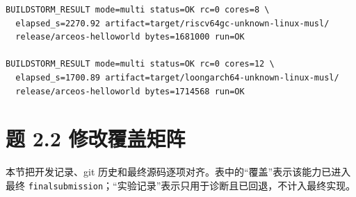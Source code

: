 \documentclass[UTF8,zihao=-4]{ctexart}
\newcommand{\code}{\nolinkurl}
\begin{document}
\begin{Verbatim}[fontsize=\small,frame=single]
BUILDSTORM_RESULT mode=multi status=OK rc=0 cores=8 \
  elapsed_s=2270.92 artifact=target/riscv64gc-unknown-linux-musl/
  release/arceos-helloworld bytes=1681000 run=OK

BUILDSTORM_RESULT mode=multi status=OK rc=0 cores=12 \
  elapsed_s=1700.89 artifact=target/loongarch64-unknown-linux-musl/
  release/arceos-helloworld bytes=1714568 run=OK
\end{Verbatim}

\section{题 2.2 修改覆盖矩阵}
\label{sec:matrix}

本节把开发记录、git 历史和最终源码逐项对齐。表中的“覆盖”表示该能力已进入最终
\code{finalsubmission}；“实验记录”表示只用于诊断且已回退，不计入最终实现。
\end{document}
